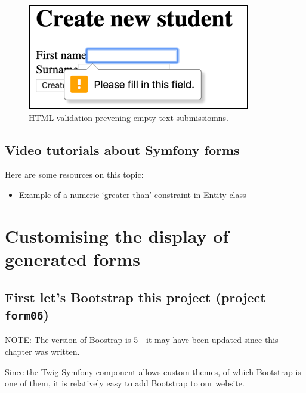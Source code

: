 \documentclass[a4paperpaper,openright]{book}
\providecommand{\tightlist}{%
  \setlength{\itemsep}{0pt}\setlength{\parskip}{0pt}}
\begin{document}
\begin{figure}
\centering
\includegraphics{./tex2pdf.-8a1528da847c818a/ca3a96067d2a7b1d92cc60f542cb170bf7dc8563.png}
\caption{HTML validation prevening empty text submissiomns.
\label{html_validation}}
\end{figure}

\hypertarget{video-tutorials-about-symfony-forms}{%
\section{Video tutorials about Symfony
forms}\label{video-tutorials-about-symfony-forms}}

Here are some resources on this topic:

\begin{itemize}
\tightlist
\item
  \href{https://symfony.com/doc/current/reference/constraints/GreaterThan.html}{Example
  of a numeric `greater than' constraint in Entity class}
\end{itemize}

\hypertarget{customising-the-display-of-generated-forms}{%
\chapter{Customising the display of generated
forms}\label{customising-the-display-of-generated-forms}}

\hypertarget{first-lets-bootstrap-this-project-project-form06}{%
\section{\texorpdfstring{First let's Bootstrap this project (project
\texttt{form06})}{First let's Bootstrap this project (project form06)}}\label{first-lets-bootstrap-this-project-project-form06}}

NOTE: The version of Boostrap is 5 - it may have been updated since this
chapter was written.

Since the Twig Symfony component allows custom themes, of which
Bootstrap is one of them, it is relatively easy to add Bootstrap to our
website.
\end{document}
